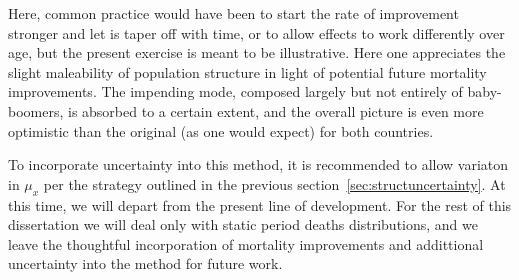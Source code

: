 Here, common practice would have been to start the rate of improvement stronger
and let is taper off with time, or to allow effects to work differently over
age, but the present exercise is meant to be illustrative. Here one appreciates
the slight maleability of population structure in light of potential future
mortality improvements. The impending mode, composed largely but not entirely of
baby-boomers, is absorbed to a certain extent, and the overall picture is even
more optimistic than the original (as one would expect) for both countries.

To incorporate uncertainty into this method, it is
recommended to allow variaton in $\mu_x$ per the strategy outlined in the previous
section~\ref{sec:structuncertainty}. At this time, we will depart from the
present line of development. For the rest of this dissertation we will deal only with static
period deaths distributions, and we leave the thoughtful incorporation of mortality 
improvements and addittional uncertainty into the method for future work.

\FloatBarrier